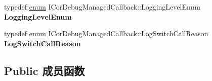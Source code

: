 \begin{DoxyCompactItemize}
\item 
\mbox{\label{interface_i_cor_debug_managed_callback_a44fc11b932795c15d0e86e9789d2e877}} 
typedef \hyperlink{interfaceenum}{enum} I\+Cor\+Debug\+Managed\+Callback\+::\+Logging\+Level\+Enum {\bfseries Logging\+Level\+Enum}
\item 
\mbox{\label{interface_i_cor_debug_managed_callback_a8eea2cd45ba4151f703189ad9fde401b}} 
typedef \hyperlink{interfaceenum}{enum} I\+Cor\+Debug\+Managed\+Callback\+::\+Log\+Switch\+Call\+Reason {\bfseries Log\+Switch\+Call\+Reason}
\end{DoxyCompactItemize}
\subsection*{Public 成员函数}
